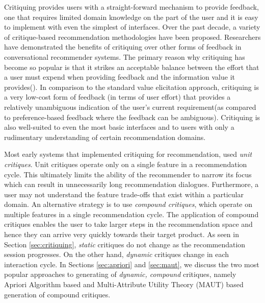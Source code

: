 Critiquing  provides users with a straight-forward mechanism to provide feedback, one that requires limited domain knowledge on the part of the user and it is easy to implement with even the simplest of interfaces.
Over the past decade, a variety of critique-based recommendation methodologies have been proposed.
Researchers have demonstrated the benefits of critiquing over other forms of feedback in conversational recommender systems.
The primary reason why critiquing has become so popular is that it strikes an acceptable balance between the effort that a user must expend when providing feedback and the information value it provides(\cite{mcginty11}).
In comparison to the standard value elicitation approach, critiquing is a very low-cost form of feedback (in terms of user effort) that provides a relatively unambiguous indication of the user's current requirement(as compared to preference-based feedback where the feedback can be ambiguous).
 Critiquing is also well-suited to even the most basic interfaces and to users with only a rudimentary understanding of certain recommendation domains.



Most early systems that implemented critiquing for recommendation, used \textit{unit critiques}.
Unit critiques operate only on a single feature in a recommendation cycle. 
This ultimately limits the ability of the recommender to narrow its focus which can result in unnecessarily long recommendation dialogues.
Furthermore, a user may not understand the feature trade-offs that exist within a particular domain.
An alternative strategy is to use \textit{compound critiques}, which operate on multiple features in a single recommendation cycle.
The application of compound critiques enables the user to take larger steps in the recommendation space and hence they can arrive very quickly towards their target product.
As seen in Section \ref{sec:critiquing}, \textit{static} critiques do not change as the recommendation session progresses. 
On the other hand, \textit{dynamic} critiques change in each interaction cycle.
In Sections \ref{sec:apriori} and \ref{sec:maut}, we discuss the two most popular approaches to generating of \textit{dynamic, compound} critiques, namely Apriori Algorithm based  and Multi-Attribute Utility Theory (MAUT) based generation of compound critiques.




